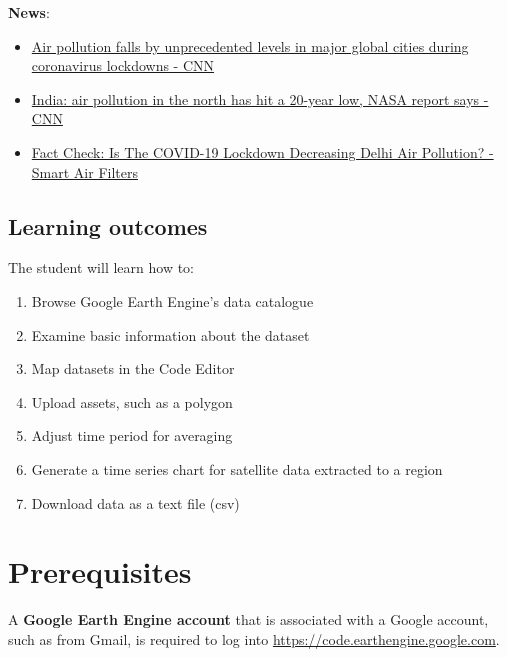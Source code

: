 \documentclass[]{book}
\providecommand{\tightlist}{%
  \setlength{\itemsep}{0pt}\setlength{\parskip}{0pt}}
\begin{document}
\textbf{News}:

\begin{itemize}
\tightlist
\item
  \href{https://www.cnn.com/2020/04/22/world/air-pollution-reduction-cities-coronavirus-intl-hnk/index.html}{Air pollution falls by unprecedented levels in major global cities during coronavirus lockdowns - CNN}
\item
  \href{https://www.cnn.com/2020/04/23/india/india-air-pollution-coronavirus-nasa-intl/index.html}{India: air pollution in the north has hit a 20-year low, NASA report says - CNN}
\item
  \href{https://smartairfilters.com/en/blog/delhi-pm25-air-pollution-decrease-coronavirus/}{Fact Check: Is The COVID-19 Lockdown Decreasing Delhi Air Pollution? - Smart Air Filters}
\end{itemize}

\hypertarget{learning-outcomes}{%
\subsection*{Learning outcomes}\label{learning-outcomes}}

The student will learn how to:

\begin{enumerate}
\def\labelenumi{\arabic{enumi}.}
\tightlist
\item
  Browse Google Earth Engine's data catalogue
\item
  Examine basic information about the dataset
\item
  Map datasets in the Code Editor
\item
  Upload assets, such as a polygon
\item
  Adjust time period for averaging
\item
  Generate a time series chart for satellite data extracted to a region
\item
  Download data as a text file (csv)
\end{enumerate}

\hypertarget{prerequisites-1}{%
\section*{Prerequisites}\label{prerequisites-1}}

A \textbf{Google Earth Engine account} that is associated with a Google account, such as from Gmail, is required to log into \url{https://code.earthengine.google.com}.
\end{document}
